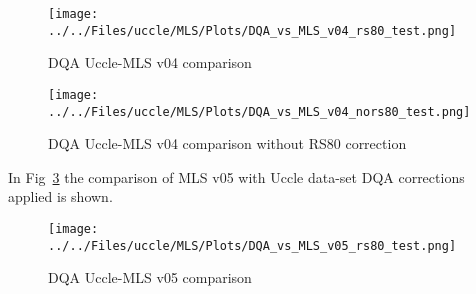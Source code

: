     \begin{figure}
        \centering
\texttt{[image: ../../Files/uccle/MLS/Plots/DQA\_vs\_MLS\_v04\_rs80\_test.png]}
    \caption{DQA Uccle-MLS v04 comparison}
            \label{fig:mlsv4_uccle}
    \end{figure}

    \begin{figure}
        \centering
\texttt{[image: ../../Files/uccle/MLS/Plots/DQA\_vs\_MLS\_v04\_nors80\_test.png]}
    \caption{DQA Uccle-MLS v04 comparison without RS80 correction}
            \label{fig:mlsv4_uccle_nors80}
    \end{figure}



In Fig~\ref{fig:mlsv5_uccle} the comparison of MLS v05 with Uccle data-set DQA corrections applied is shown.

    \begin{figure}
        \centering
\texttt{[image: ../../Files/uccle/MLS/Plots/DQA\_vs\_MLS\_v05\_rs80\_test.png]}
    \caption{DQA Uccle-MLS v05 comparison}
            \label{fig:mlsv5_uccle}
    \end{figure}











